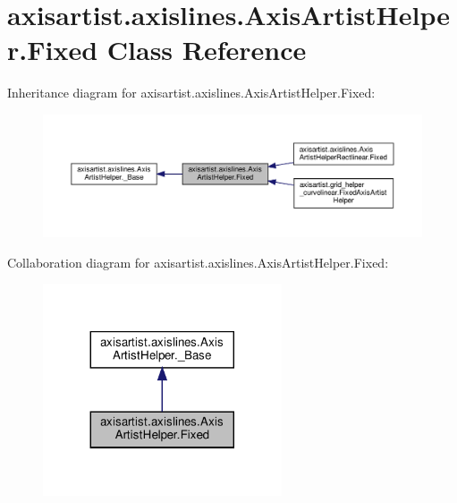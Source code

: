 \hypertarget{classaxisartist_1_1axislines_1_1AxisArtistHelper_1_1Fixed}{}\section{axisartist.\+axislines.\+Axis\+Artist\+Helper.\+Fixed Class Reference}
\label{classaxisartist_1_1axislines_1_1AxisArtistHelper_1_1Fixed}


Inheritance diagram for axisartist.\+axislines.\+Axis\+Artist\+Helper.\+Fixed\+:
\nopagebreak
\begin{figure}[H]
\begin{center}
\leavevmode
\includegraphics[width=350pt]{classaxisartist_1_1axislines_1_1AxisArtistHelper_1_1Fixed__inherit__graph}
\end{center}
\end{figure}


Collaboration diagram for axisartist.\+axislines.\+Axis\+Artist\+Helper.\+Fixed\+:
\nopagebreak
\begin{figure}[H]
\begin{center}
\leavevmode
\includegraphics[width=200pt]{classaxisartist_1_1axislines_1_1AxisArtistHelper_1_1Fixed__coll__graph}
\end{center}
\end{figure}
